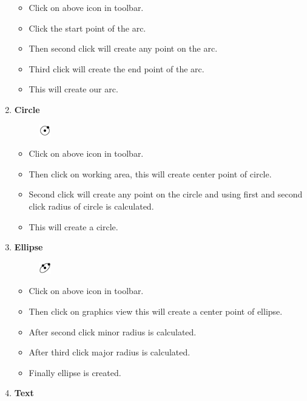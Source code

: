 \begin{enumerate}
\begin{figure}[h!]
\end{figure}
\begin{itemize}
\item Click on above icon in toolbar.
\item Click the start point of the arc.
\item Then second click will create any point on the arc.
\item Third click will create the end point of the arc.
\item This will create our arc.
\end{itemize}
\item \textbf{Circle}
\begin{figure}[h!]
\centering
\includegraphics[width=0.05\textwidth]{images/circle.jpg}\\
\end{figure}
\begin{itemize}
\item Click on above icon in toolbar.
\item Then click on working area, this will create center point of circle.
\item Second click will create any point on the circle and using first and second click radius of circle is calculated.
\item This will create a circle.
\end{itemize}
\item \textbf{Ellipse}
\begin{figure}[h!]
\centering
\includegraphics[width=0.05\textwidth]{images/ellipse.jpg}\\
\end{figure}
\begin{itemize}
\item Click on above icon in toolbar.
\item Then click on graphics view this will create a center point of ellipse.
\item After second click minor radius is calculated.
\item After third click major radius is calculated.
\item Finally ellipse is created.
\end{itemize}
\newpage
\item \textbf{Text}

\end{enumerate}
